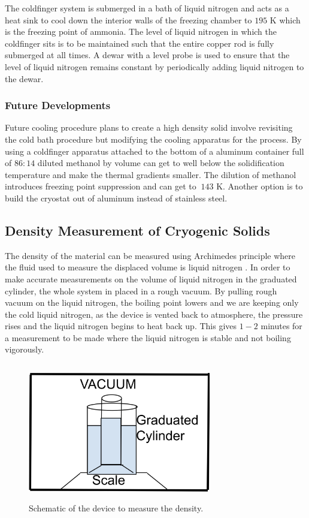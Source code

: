 \documentclass[12pt,notitlepage]{amsart}
\begin{document}
The coldfinger system \cite{cf} is submerged in a bath of liquid nitrogen and acts as a heat sink to cool down the interior walls of the freezing chamber to $195$ K which is the freezing point of ammonia. The level of liquid nitrogen in which the coldfinger sits is to be maintained such that the entire copper rod is fully submerged at all times. A dewar with a level probe is used to ensure that the level of liquid nitrogen remains constant by periodically adding liquid nitrogen to the dewar.
 \subsubsection{Future Developments}
Future cooling procedure plans to create a high density solid involve revisiting the cold bath procedure but modifying the cooling apparatus for the process. By using a coldfinger apparatus attached to the bottom of a aluminum container full of $86:14$ diluted methanol by volume can get to well below the solidification temperature \cite{winans} and make the thermal gradients smaller. The dilution of methanol introduces freezing point suppression and can get to $~143$ K.  Another option is to build the cryostat out of aluminum instead of stainless steel. 


\subsection{Density Measurement of Cryogenic Solids}The density of  the material can be measured using Archimedes principle where the fluid used to measure the displaced volume is liquid nitrogen \cite{oscar}. In order to make accurate measurements on the volume of liquid nitrogen in the graduated cylinder, the whole system in placed in a rough vacuum. By pulling rough vacuum on the liquid nitrogen, the boiling point lowers and we are keeping only the cold liquid nitrogen, as the device is vented back to atmosphere, the pressure rises and the liquid nitrogen begins to heat back up. This gives $1-2$ minutes for a measurement to be made where the liquid nitrogen is stable and not boiling vigorously.
\begin{figure}[h]
 \caption{Schematic of the device to measure the density.}
 \label{rho}
 \centering
 \includegraphics[width = 8cm,height = 6cm]{desinty} 
\end{figure}
\end{document}
